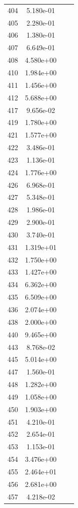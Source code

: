 \documentclass[12pt]{article}
\begin{document}
\begin{longtable}{@{}cccc@{}}
404 & 5.180e-01 &  &  \\
405 & 2.280e-01 &  &  \\
406 & 1.380e-01 &  &  \\
407 & 6.649e-01 &  &  \\
408 & 4.580e+00 &  &  \\
410 & 1.984e+00 &  &  \\
411 & 1.456e+00 &  &  \\
412 & 5.688e+00 &  &  \\
417 & 9.656e-02 &  &  \\
419 & 1.780e+00 &  &  \\
421 & 1.577e+00 &  &  \\
422 & 3.486e-01 &  &  \\
423 & 1.136e-01 &  &  \\
424 & 1.776e+00 &  &  \\
426 & 6.968e-01 &  &  \\
427 & 5.348e-01 &  &  \\
428 & 1.986e-01 &  &  \\
429 & 2.900e-01 &  &  \\
430 & 3.740e-01 &  &  \\
431 & 1.319e+01 &  &  \\
432 & 1.750e+00 &  &  \\
433 & 1.427e+00 &  &  \\
434 & 6.362e+00 &  &  \\
435 & 6.509e+00 &  &  \\
436 & 2.074e+00 &  &  \\
438 & 2.000e+00 &  &  \\
440 & 9.465e+00 &  &  \\
443 & 8.768e-02 &  &  \\
445 & 5.014e+00 &  &  \\
447 & 1.560e-01 &  &  \\
448 & 1.282e+00 &  &  \\
449 & 1.058e+00 &  &  \\
450 & 1.903e+00 &  &  \\
451 & 4.210e-01 &  &  \\
452 & 2.654e-01 &  &  \\
453 & 1.153e-01 &  &  \\
454 & 3.476e+00 &  &  \\
455 & 2.464e+01 &  &  \\
456 & 2.681e+00 &  &  \\
457 & 4.218e-02 &  &  \\

\end{longtable}
\end{document}
